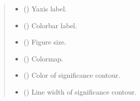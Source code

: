 \documentclass[letterpaper,10pt,english]{sphinxhowto}
\begin{document}
\begin{fulllineitems}
\begin{quote}
\begin{description}
\begin{itemize}
\item {} 
\sphinxAtStartPar
{} (\sphinxstyleliteralemphasis{\sphinxupquote{, }}\sphinxstyleliteralemphasis{\sphinxupquote{ (}}\sphinxstyleliteralemphasis{\sphinxupquote{)}}) \textendash{} Y\sphinxhyphen{}axis label.

\item {} 
\sphinxAtStartPar
{} (\sphinxstyleliteralemphasis{\sphinxupquote{, }}) \textendash{} Colorbar label.

\item {} 
\sphinxAtStartPar
{} (\sphinxstyleliteralemphasis{\sphinxupquote{, }}\sphinxstyleliteralemphasis{\sphinxupquote{(}}\sphinxstyleliteralemphasis{\sphinxupquote{, }}\sphinxstyleliteralemphasis{\sphinxupquote{)}}) \textendash{} Figure size.

\item {} 
\sphinxAtStartPar
{} (\sphinxstyleliteralemphasis{\sphinxupquote{, }}) \textendash{} Colormap.

\item {} 
\sphinxAtStartPar
{} (\sphinxstyleliteralemphasis{\sphinxupquote{, }}) \textendash{} Color of significance contour.

\item {} 
\sphinxAtStartPar
{} (\sphinxstyleliteralemphasis{\sphinxupquote{, }}) \textendash{} Line width of significance contour.


\end{itemize}
\end{description}
\end{quote}
\end{fulllineitems}
\end{document}
